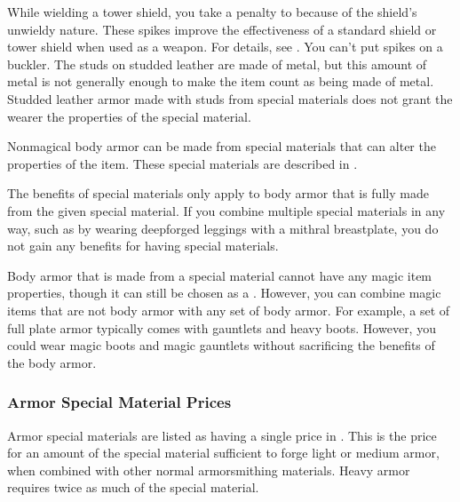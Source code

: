     While wielding a tower shield, you take a  penalty to  because of the shield's unwieldy nature.
     These spikes improve the effectiveness of a standard shield or tower shield when used as a weapon.
    For details, see .
    You can't put spikes on a buckler.
     The studs on studded leather are made of metal, but this amount of metal is not generally enough to make the item count as being made of metal.
    Studded leather armor made with studs from special materials does not grant the wearer the properties of the special material.

    Nonmagical body armor can be made from special materials that can alter the properties of the item.
    These special materials are described in .

    The benefits of special materials only apply to body armor that is fully made from the given special material.
    If you combine multiple special materials in any way, such as by wearing deepforged leggings with a mithral breastplate, you do not gain any benefits for having special materials.

    Body armor that is made from a special material cannot have any magic item properties, though it can still be chosen as a .
    However, you can combine magic items that are not body armor with any set of body armor.
    For example, a set of full plate armor typically comes with gauntlets and heavy boots.
    However, you could wear magic boots and magic gauntlets without sacrificing the benefits of the body armor.

    \subsubsection{Armor Special Material Prices}
      Armor special materials are listed as having a single price in .
      This is the price for an amount of the special material sufficient to forge light or medium armor, when combined with other normal armorsmithing materials.
      Heavy armor requires twice as much of the special material.

